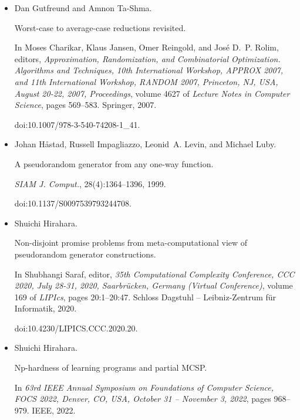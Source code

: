 \documentclass[10pt,a4paper]{article}
\begin{document}
\begin{itemize}
\item[] 
[13]

Dan Gutfreund and Amnon Ta-Shma.


Worst-case to average-case reductions revisited.


In Moses Charikar, Klaus Jansen, Omer Reingold, and José D. P.
Rolim, editors, \emph{Approximation, Randomization, and Combinatorial
Optimization. Algorithms and Techniques, 10th International Workshop,
APPROX 2007, and 11th International Workshop, RANDOM 2007, Princeton, NJ,
USA, August 20-22, 2007, Proceedings}, volume 4627 of \emph{Lecture Notes in
Computer Science}, pages 569–583. Springer, 2007.


doi:10.1007/978-3-540-74208-1\_41.





\item[] 
[14]

Johan Håstad, Russell Impagliazzo, Leonid A. Levin, and Michael Luby.


A pseudorandom generator from any one-way function.


\emph{SIAM J. Comput.}, 28(4):1364–1396, 1999.


doi:10.1137/S0097539793244708.





\item[] 
[15]

Shuichi Hirahara.


Non-disjoint promise problems from meta-computational view of
pseudorandom generator constructions.


In Shubhangi Saraf, editor, \emph{35th Computational Complexity
Conference, CCC 2020, July 28-31, 2020, Saarbrücken, Germany (Virtual
Conference)}, volume 169 of \emph{LIPIcs}, pages 20:1–20:47. Schloss Dagstuhl
– Leibniz-Zentrum für Informatik, 2020.


doi:10.4230/LIPICS.CCC.2020.20.





\item[] 
[16]

Shuichi Hirahara.


Np-hardness of learning programs and partial MCSP.


In \emph{63rd IEEE Annual Symposium on Foundations of Computer
Science, FOCS 2022, Denver, CO, USA, October 31 – November 3, 2022}, pages
968–979. IEEE, 2022.



\end{itemize}
\end{document}
